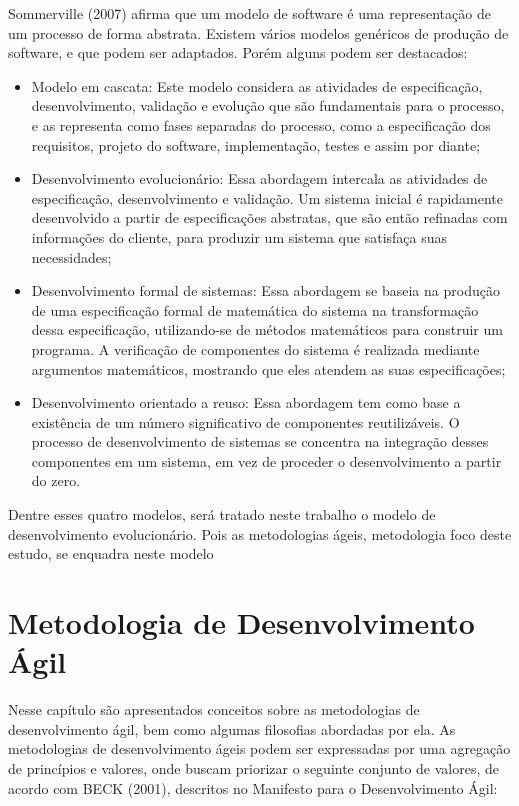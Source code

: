 Sommerville (2007) afirma que um modelo de software é uma representação de um processo de forma abstrata. Existem vários modelos genéricos de produção de software, e que podem ser adaptados. Porém alguns podem ser destacados:

\begin{itemize}
    \item Modelo em cascata: Este modelo considera as atividades de especificação, desenvolvimento, validação e evolução que são fundamentais para o processo, e as representa como fases separadas do processo, como a especificação dos requisitos, projeto do software, implementação, testes e assim por diante;

    \item Desenvolvimento evolucionário: Essa abordagem intercala as atividades de especificação, desenvolvimento e validação. Um sistema inicial é rapidamente desenvolvido a partir de especificações abstratas, que são então refinadas com informações do cliente, para produzir um sistema que satisfaça suas necessidades;

    \item Desenvolvimento formal de sistemas: Essa abordagem se baseia na produção de uma especificação formal de matemática do sistema na transformação dessa especificação, utilizando-se de métodos matemáticos para construir um programa. A verificação de componentes do sistema é realizada mediante argumentos matemáticos, mostrando que eles atendem as suas especificações;

    \item Desenvolvimento orientado a reuso: Essa abordagem tem como base a existência de um número significativo de componentes reutilizáveis. O processo de desenvolvimento de sistemas se concentra na integração desses componentes em um sistema, em vez de proceder o desenvolvimento a partir do zero.
\end{itemize}

Dentre esses quatro modelos, será tratado neste trabalho o modelo de desenvolvimento evolucionário. Pois as metodologias ágeis, metodologia foco deste estudo, se enquadra neste modelo



\section{Metodologia de Desenvolvimento Ágil}
\label{sec:section_name}

Nesse capítulo são apresentados conceitos sobre as metodologias de desenvolvimento ágil, bem como algumas filosofias abordadas por ela.
As metodologias de desenvolvimento ágeis podem ser expressadas por uma agregação de princípios e valores, onde buscam priorizar o seguinte conjunto de valores, de acordo com BECK (2001), descritos no Manifesto para o Desenvolvimento Ágil:


